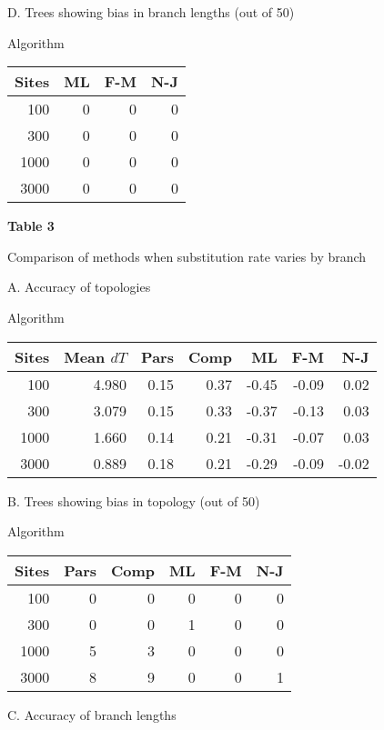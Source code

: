 \begin{flushleft}
\begin{center}
\bigskip
D. Trees showing bias in branch lengths (out of 50)

Algorithm

\begin{tabular}{| r | r r r |}
\hline
Sites  & ML & F-M & N-J\\
\hline
100  & 0 & 0 & 0\\
300  & 0 & 0 & 0\\
1000  & 0 & 0 & 0\\
3000  & 0 & 0 & 0\\
\hline
\end{tabular}
\end{center}
\newpage

{\bf Table 3

Comparison of methods when substitution rate varies by branch}

\begin{center}
A.  Accuracy of topologies

Algorithm

\begin{tabular}{| r | r | r r r r r |}
\hline
Sites & Mean $dT$ & Pars & Comp & ML & F-M & N-J \\
\hline
100 & 4.980 & 0.15 & 0.37 & -0.45 & -0.09 & 0.02\\
300 & 3.079 & 0.15 & 0.33 & -0.37 & -0.13 & 0.03\\
1000 & 1.660 & 0.14 & 0.21 & -0.31 & -0.07  & 0.03\\
3000 & 0.889 & 0.18 & 0.21 & -0.29 & -0.09  & -0.02\\
\hline
\end{tabular}
\bigskip


B. Trees showing bias in topology (out of 50)

Algorithm

\begin{tabular}{| r | r r r r r |}
\hline
Sites  & Pars & Comp & ML & F-M  & N-J\\
\hline
100  & 0 & 0 & 0 & 0 & 0\\
300  & 0 & 0 & 1 & 0 & 0\\
1000  & 5 & 3 & 0 & 0 & 0\\
3000  & 8 & 9 & 0 & 0 & 1\\
\hline
\end{tabular}
\end{center}
\bigskip

\newpage


\bigskip
\begin{center}
C.  Accuracy of branch lengths


\end{center}
\end{flushleft}
